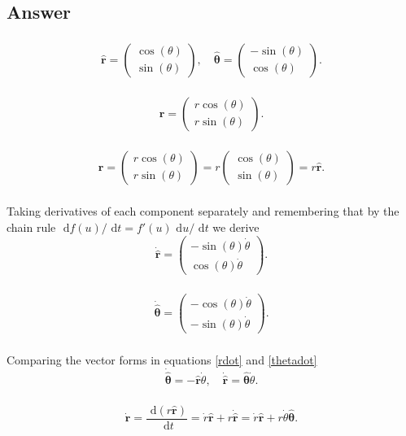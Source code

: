 \documentclass[]{article}
\newcommand{\myvec}[1]{\ensuremath{\begin{pmatrix}#1\end{pmatrix}}}
\newcommand{\bb}{\begin{equation}}
\newcommand{\ee}{\end{equation}}
\newcommand{\rd}{\text{ d}}
\newcommand{\eqns}[2]{equations \eqref{#1} and \eqref{#2}}
\renewcommand{\l}{\left(}
\renewcommand{\r}{\right)}
\begin{document}
\begin{Answ}
\subsection{Answer}
\subsubsection{}
\bb
\hat{\bm{r}}=\myvec{\cos(\theta)\\ \sin(\theta)}, \quad \hat{\bm{\theta}}=\myvec{-\sin(\theta)\\ \cos(\theta)}.
\ee
\subsubsection{}
\bb
\bm{r}=\myvec{r\cos(\theta)\\r\sin(\theta)}.
\ee
\subsubsection{}
\bb
\bm{r}=\myvec{r\cos(\theta)\\r\sin(\theta)}=r\myvec{\cos(\theta)\\\sin(\theta)}=r\hat{\bm{r}}.
\ee
\subsubsection{}
Taking derivatives of each component separately and remembering that by the chain rule $\rd f(u)/\rd t=f'(u)\rd u/\rd t$ we derive
\bb
\dot{\hat{\bm{r}}}=\myvec{-\sin(\theta)\dot{\theta}\\\cos(\theta)\dot{\theta}}.\label{rdot}
\ee
\subsubsection{}
\bb
\dot{\hat{\bm{\theta}}}=\myvec{-\cos(\theta)\dot{\theta}\\-\sin(\theta)\dot{\theta}}.\label{thetadot}
\ee
\subsubsection{}
Comparing the vector forms in \eqns{rdot}{thetadot}
\bb
\dot{\hat{\bm{\theta}}}=-\hat{\bm{r}}\dot{\theta},\quad
\dot{\hat{\bm{r}}}=\hat{\bm{\theta}}\dot{\theta}.
\ee
\subsubsection{}
\bb
\dot{\bm{r}}=\frac{\rd \l r\hat{\bm{r}} \r}{\rd t}=\dot{r}\hat{\bm{r}}+r\dot{\hat{\bm{r}}}=\dot{r}\hat{\bm{r}}+r\dot{\theta}\hat{\bm{\theta}}.
\ee

\end{Answ}
\end{document}
